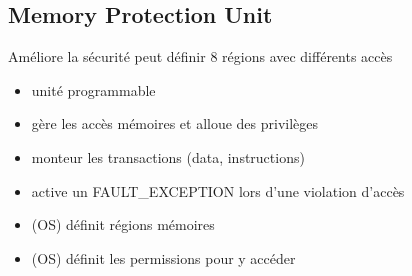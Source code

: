 \documentclass[resume]{subfiles}
\begin{document}
\subsection{Memory Protection Unit}

Améliore la sécurité peut définir 8 régions avec différents accès
\begin{itemize}
\item unité programmable
\item gère les accès mémoires et alloue des privilèges
\item monteur les transactions (data, instructions)
\item active un FAULT\_EXCEPTION lors d'une violation d'accès
\item (OS) définit régions mémoires
\item (OS) définit les permissions pour y accéder
\end{itemize}
\end{document}
